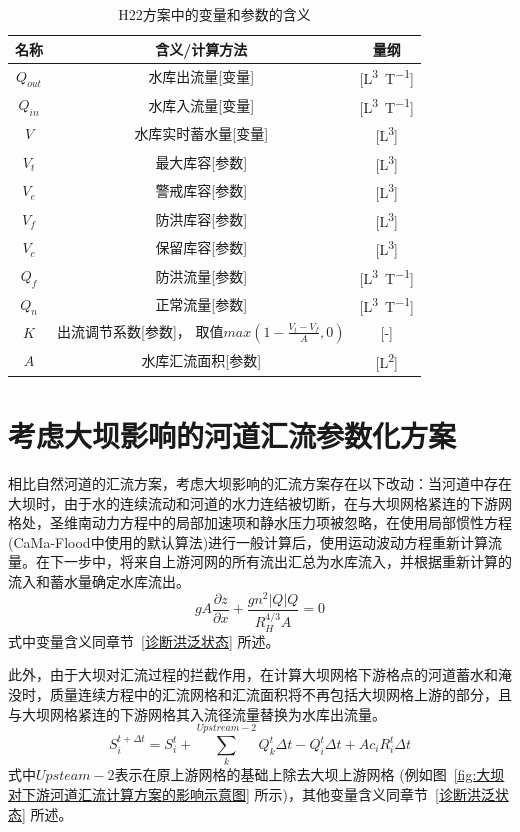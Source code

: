 \begin{table}[htbp]
    \centering
    \caption{H22方案中的变量和参数的含义}
    \label{tab:H22方案变量参数表}
    \begin{threeparttable}
    \begin{tabular}{ccc}
    \toprule
    名称 & 含义/计算方法 & 量纲 \\ \midrule
    $Q_{out}$  & 水库出流量[变量]  & [\unit{L^3.T^{-1}}]  \\
    $Q_{in}$ & 水库入流量[变量] & [\unit{L^3.T^{-1}}] \\
    $V$ & 水库实时蓄水量[变量] & [\unit{L^3}] \\
    $V_{t}$  &  最大库容[参数] & [\unit{L^3}] \\
    $V_{e}$ & 警戒库容[参数]  &[\unit{L^3}] \\
    $V_{f}$  & 防洪库容[参数] & [\unit{L^3}]  \\
    $V_{c}$  & 保留库容[参数] & [\unit{L^3}]  \\
    $Q_{f}$ & 防洪流量[参数] & [\unit{L^3.T^{-1}}]  \\
    $Q_{n}$ & 正常流量[参数] & [\unit{L^3.T^{-1}}]  \\
    $K$ & \makecell{出流调节系数[参数]，\\取值${max(1-\frac{V_{t}-V_{f}}{A},0)}$} & [-] \\
    $A$ & 水库汇流面积[参数] & [\unit{L^2}] \\
    \bottomrule
    \end{tabular}
    \end{threeparttable}
\end{table}

\section{考虑大坝影响的河道汇流参数化方案}
相比自然河道的汇流方案，考虑大坝影响的汇流方案存在以下改动：当河道中存在大坝时，由于水的连续流动和河道的水力连结被切断，在与大坝网格紧连的下游网格处，圣维南动力方程中的局部加速项和静水压力项被忽略，在使用局部惯性方程(CaMa-Flood中使用的默认算法)进行一般计算后，使用运动波动方程重新计算流量。在下一步中，将来自上游河网的所有流出汇总为水库流入，并根据重新计算的流入和蓄水量确定水库流出。
\begin{equation}
g A \frac{\partial z}{\partial x}+\frac{g n^{2}|Q| Q}{R_{H}^{4 / 3} A}=0
\end{equation}
式中变量含义同章节~\ref{诊断洪泛状态} 所述。


此外，由于大坝对汇流过程的拦截作用，在计算大坝网格下游格点的河道蓄水和淹没时，质量连续方程中的汇流网格和汇流面积将不再包括大坝网格上游的部分，且与大坝网格紧连的下游网格其入流径流量替换为水库出流量。
\begin{equation}
S_{i}^{t+\Delta t}=S_{i}^{t}+\sum_{k}^{Upstream-2} Q_{k}^{t} \Delta t-Q_{i}^{t} \Delta t+A c_{i} R_{i}^{t} \Delta t
\end{equation}
式中$Upsteam-2$表示在原上游网格的基础上除去大坝上游网格 (例如图~\ref{fig:大坝对下游河道汇流计算方案的影响示意图} 所示)，其他变量含义同章节~\ref{诊断洪泛状态} 所述。

